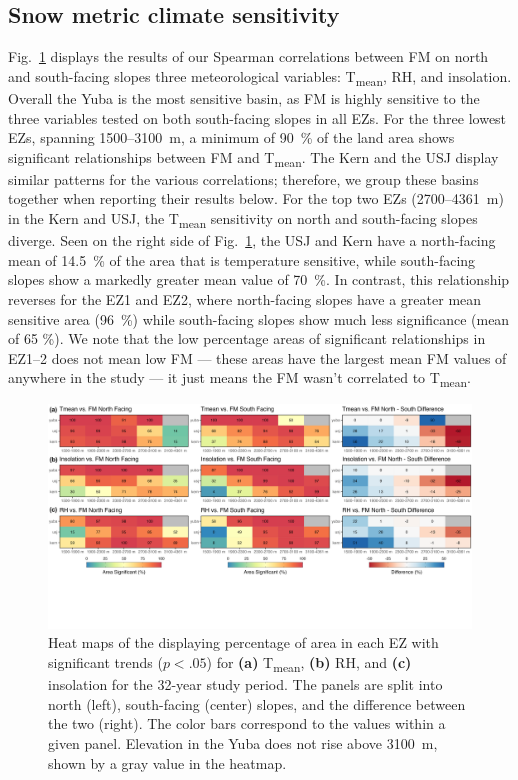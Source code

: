 \hypertarget{ch2-results-3}{\subsection{Snow metric climate sensitivity}\label{ch2-results-3}}

Fig.~\ref{fig:heat_map} displays the results of our Spearman correlations between FM on north and south-facing slopes three meteorological variables: T\textsubscript{mean}, RH, and insolation. Overall the Yuba is the most sensitive basin, as FM is highly sensitive to the three variables tested on both south-facing slopes in all EZs. For the three lowest EZs, spanning 1500--3100~m, a minimum of 90~\% of the land area shows significant relationships between FM and T\textsubscript{mean}. The Kern and the USJ display similar patterns for the various correlations; therefore, we group these basins together when reporting their results below. For the top two EZs (2700--4361~m) in the Kern and USJ, the T\textsubscript{mean} sensitivity on north and south-facing slopes diverge. Seen on the right side of Fig.~\ref{fig:heat_map}, the USJ and Kern have a north-facing mean of 14.5~\% of the area that is temperature sensitive, while south-facing slopes show a markedly greater mean value of 70~\%. In contrast, this relationship reverses for the EZ1 and EZ2, where north-facing slopes have a greater mean sensitive area (96~\%) while south-facing slopes show much less significance (mean of 65 \%). We note that the low percentage areas of significant relationships in EZ1--2 does not mean low FM --- these areas have the largest mean FM values of anywhere in the study --- it just means the FM wasn't correlated to T\textsubscript{mean}.


\begin{figure}[h]
\centering
\includegraphics[width=\textwidth]{figures/ch2_figs/metvars_fm_heatmaps_v4.png}
\caption{Heat maps of the displaying percentage of area in each EZ with significant trends ($p < .05$) for \textbf{(a)} T\textsubscript{mean}, \textbf{(b)} RH, and \textbf{(c)} insolation for the 32-year study period. The panels are split into north (left), south-facing (center) slopes, and the difference between the two (right). The color bars correspond to the values within a given panel. Elevation in the Yuba does not rise above 3100~m, shown by a gray value in the heatmap.}
\label{fig:heat_map}
\end{figure}



